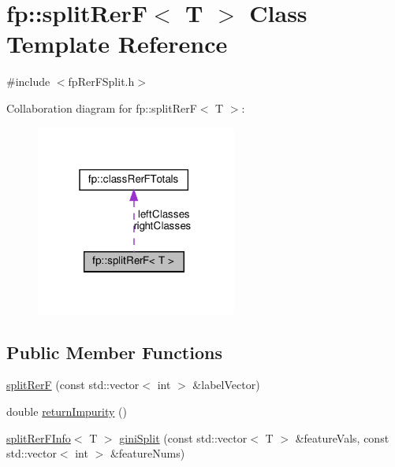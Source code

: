 \hypertarget{classfp_1_1splitRerF}{}\section{fp\+:\+:split\+RerF$<$ T $>$ Class Template Reference}
\label{classfp_1_1splitRerF}


{\ttfamily \#include $<$fp\+Rer\+F\+Split.\+h$>$}



Collaboration diagram for fp\+:\+:split\+RerF$<$ T $>$\+:
\nopagebreak
\begin{figure}[H]
\begin{center}
\leavevmode
\includegraphics[width=187pt]{classfp_1_1splitRerF__coll__graph}
\end{center}
\end{figure}
\subsection*{Public Member Functions}
\begin{DoxyCompactItemize}
\item 
\hyperlink{classfp_1_1splitRerF_ab1ce3680d3e353a59d3efafd1a3064c2}{split\+RerF} (const std\+::vector$<$ int $>$ \&label\+Vector)
\item 
double \hyperlink{classfp_1_1splitRerF_ab1bfbd05c673d7806dfdc2f7b948ee8d}{return\+Impurity} ()
\item 
\hyperlink{classfp_1_1splitRerFInfo}{split\+Rer\+F\+Info}$<$ T $>$ \hyperlink{classfp_1_1splitRerF_a5b727300d091166f7a0044162491b1e9}{gini\+Split} (const std\+::vector$<$ T $>$ \&feature\+Vals, const std\+::vector$<$ int $>$ \&feature\+Nums)
\end{DoxyCompactItemize}

